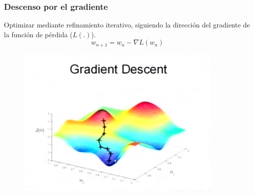 \documentclass[10pt,center]{beamer}
\begin{document}
\begin{frame}
  \frametitle{Descenso por el gradiente}
    Optimizar mediante refinamiento iterativo, siguiendo la dirección del gradiente de la función de pérdida ($L(.)$).
  \begin{equation*}
    w_{n+1} = w_n - \nabla L(w_n)
  \end{equation*}
  \begin{figure}[h]
  \captionsetup[subfigure]{labelformat=empty}
    \begin{center}
	    \includegraphics[height=0.4\textheight]{./img/gradient_descent_1.png}
    \end{center}
  \end{figure}
\end{frame}
\end{document}
